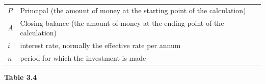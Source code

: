 \begin{itemize}[noitemsep]
{\begin{center}
\begin{xtabular*}{\mytablewidth}[t]{|p{10\mystarwidth}|p{10\mystarwidth}|}
                  $P$
                 &
        Principal (the amount of money at the starting point of the calculation)%
     \tabularnewline{}
                  $A$
                 &
        Closing balance (the amount of money at the ending point of the calculation)%
     \tabularnewline{}
                  $i$
                 &
        interest rate, normally the effective rate per annum%
     \tabularnewline{}
                  $n$
                 &
        period for which the investment is made%
     \tabularnewline{}
    \end{xtabular*}
      \end{center}
    \begin{center}{\small\bfseries Table 3.4}\end{center}
}
\end{itemize}
